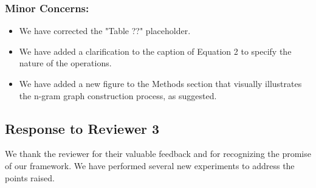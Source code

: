 \documentclass[11pt, a4paper]{article}
\begin{document}
	\subsubsection*{Minor Concerns:}
	\begin{itemize}
		\item We have corrected the "Table ??" placeholder.
		\item We have added a clarification to the caption of Equation 2 to specify the nature of the operations.
		\item We have added a new figure to the Methods section that visually illustrates the n-gram graph construction process, as suggested.
	\end{itemize}
	
	\clearpage
	
	\subsection*{Response to Reviewer 3}
	
	We thank the reviewer for their valuable feedback and for recognizing the promise of our framework. We have performed several new experiments to address the points raised.
	
\end{document}

